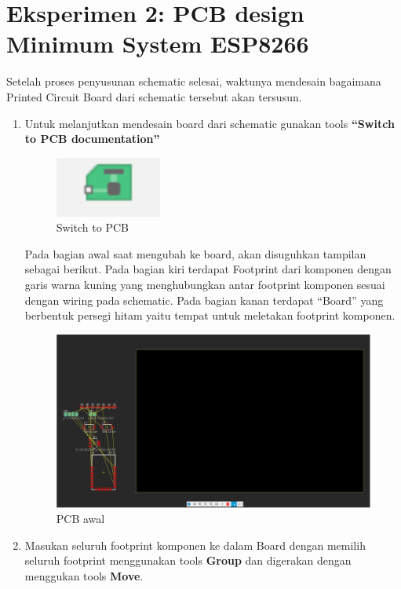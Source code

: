 \section{Eksperimen 2: PCB design Minimum System ESP8266}
Setelah proses penyusunan schematic selesai, waktunya mendesain bagaimana Printed Circuit Board
dari schematic tersebut akan tersusun.
\begin{enumerate}
    \item Untuk melanjutkan mendesain board dari schematic gunakan tools \textbf{“Switch to PCB
    documentation”}
    \begin{figure}[H]
        \centering
        \includegraphics[width=0.4\linewidth]{P1/img/switchtopcb.png}
        \caption{Switch to PCB} 
        \label{fig:Switch to PCB}
    \end{figure}
    Pada bagian awal saat mengubah ke board, akan disuguhkan tampilan sebagai berikut. Pada
    bagian kiri terdapat Footprint dari komponen dengan garis warna kuning yang
    menghubungkan antar footprint komponen sesuai dengan wiring pada schematic. Pada
    bagian kanan terdapat “Board” yang berbentuk persegi hitam yaitu tempat untuk meletakan
    footprint komponen.
    \begin{figure}[H]
        \centering
        \includegraphics[width=0.6\linewidth]{P1/img/awal_switch_ke_pcb_design.jpg}
        \caption{PCB awal} 
        \label{fig:PCBawal}
    \end{figure}
    \vspace{-\topsep}
    \item Masukan seluruh footprint komponen ke dalam Board dengan memilih seluruh footprint menggunakan tools \textbf{Group} dan digerakan dengan menggukan tools \textbf{Move}.
    \begin{figure}[H]

\end{figure}
\end{enumerate}
